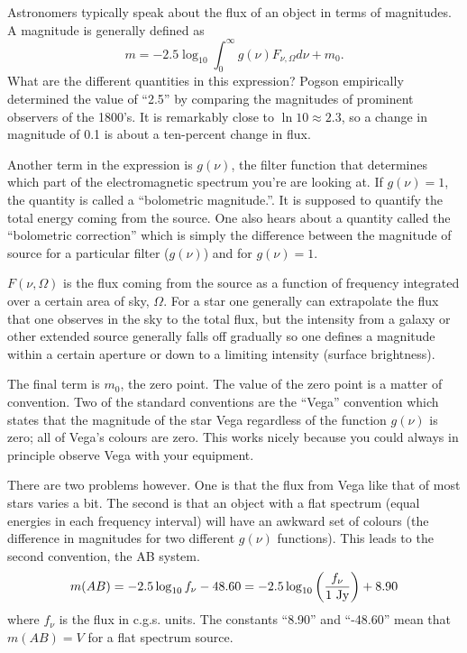 Astronomers typically speak about the flux of an object in terms of 
magnitudes.   A magnitude is generally defined as
\begin{equation}
m = -2.5 \log_{10} \int_0^\infty g(\nu) F_{\nu,\Omega} d \nu + m_0.
\label{eq:11}
\end{equation}
What are the different quantities in this expression?  Pogson
empirically determined the value of ``2.5'' by comparing the
magnitudes of prominent observers of the 1800's.   It is remarkably close
to $\ln 10 \approx 2.3$, so a change in magnitude of 0.1 is about a 
ten-percent change in flux.

Another term in the expression is $g(\nu)$, the filter function that
determines which part of the electromagnetic spectrum you're are
looking at.  If $g(\nu)=1$, the quantity is called a ``bolometric
magnitude.''.  It is supposed to quantify the total energy coming from
the source.  One also hears about a quantity called the ``bolometric
correction'' which is simply the
difference between the magnitude of source for a particular filter
($g(\nu)$) and for $g(\nu)=1$.

$F(\nu,\Omega)$ is the flux coming from the source as a function of
frequency integrated over a certain area of sky, $\Omega$.  For a star
one generally can extrapolate the flux that one observes in the sky to
the total flux, but the intensity from a galaxy or other extended
source generally falls off gradually so one defines a magnitude within
a certain aperture or down to a limiting intensity (surface
brightness).   

The final term is $m_0$, the zero point.  The value of the zero point
is a matter of convention.  Two of the standard conventions are the
``Vega'' convention which states that the magnitude of the star Vega
regardless of the function $g(\nu)$ is zero; all of Vega's colours are
zero.  This works nicely because you could always in principle observe
Vega with your equipment.

There are two problems however.  One is that the flux from Vega like
that of most stars varies a bit.  The second is that an object with a
flat spectrum (equal energies in each frequency interval) will have an
awkward set of colours (the difference in magnitudes for two different
$g(\nu)$ functions).  This leads to the second convention, the AB
system.
\begin{equation}
m(AB) = -2.5 \log_{10} f_\nu - 48.60 = -2.5 \log_{10} \left (
\frac{f_\nu}{1~\hbox{\rm Jy}}\right ) + 8.90
\label{eq:12}
\end{equation}
where $f_\nu$ is the flux in c.g.s. units.  The constants ``8.90'' 
and ``-48.60'' mean that $m(AB)=V$ for a flat spectrum source.

